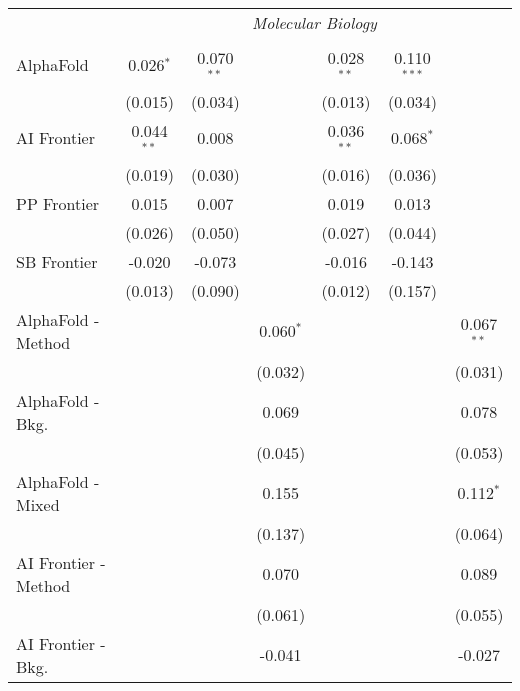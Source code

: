 \begin{tabular}{lcccccc}
 & \multicolumn{6}{c}{\textit{Molecular Biology}} \\ \\
   AlphaFold            & 0.026$^{*}$  & 0.070$^{**}$ &              & 0.028$^{**}$ & 0.110$^{***}$ &   \\   
                        & (0.015)      & (0.034)      &              & (0.013)      & (0.034)       &   \\   
   AI Frontier          & 0.044$^{**}$ & 0.008        &              & 0.036$^{**}$ & 0.068$^{*}$   &   \\   
                        & (0.019)      & (0.030)      &              & (0.016)      & (0.036)       &   \\   
   PP Frontier          & 0.015        & 0.007        &              & 0.019        & 0.013         &   \\   
                        & (0.026)      & (0.050)      &              & (0.027)      & (0.044)       &   \\   
   SB Frontier          & -0.020       & -0.073       &              & -0.016       & -0.143        &   \\   
                        & (0.013)      & (0.090)      &              & (0.012)      & (0.157)       &   \\   
   AlphaFold - Method   &              &              & 0.060$^{*}$  &              &               & 0.067$^{**}$\\   
                        &              &              & (0.032)      &              &               & (0.031)\\   
   AlphaFold - Bkg.     &              &              & 0.069        &              &               & 0.078\\   
                        &              &              & (0.045)      &              &               & (0.053)\\   
   AlphaFold - Mixed    &              &              & 0.155        &              &               & 0.112$^{*}$\\   
                        &              &              & (0.137)      &              &               & (0.064)\\   
   AI Frontier - Method &              &              & 0.070        &              &               & 0.089\\   
                        &              &              & (0.061)      &              &               & (0.055)\\   
   AI Frontier - Bkg.   &              &              & -0.041       &              &               & -0.027\\   

\end{tabular}
